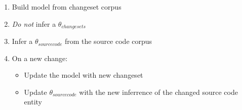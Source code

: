 \begin{enumerate}
    \item Build model from changeset corpus
    \item \emph{Do not} infer a $\theta_{changesets}$
    \item Infer a $\theta_{source code}$ from the source code corpus
    \item On a new change:
        \begin{itemize}
            \item Update the model with new changeset
            \item Update $\theta_{source code}$ with the new inferrence of the changed source code entity
        \end{itemize}
\end{enumerate}


